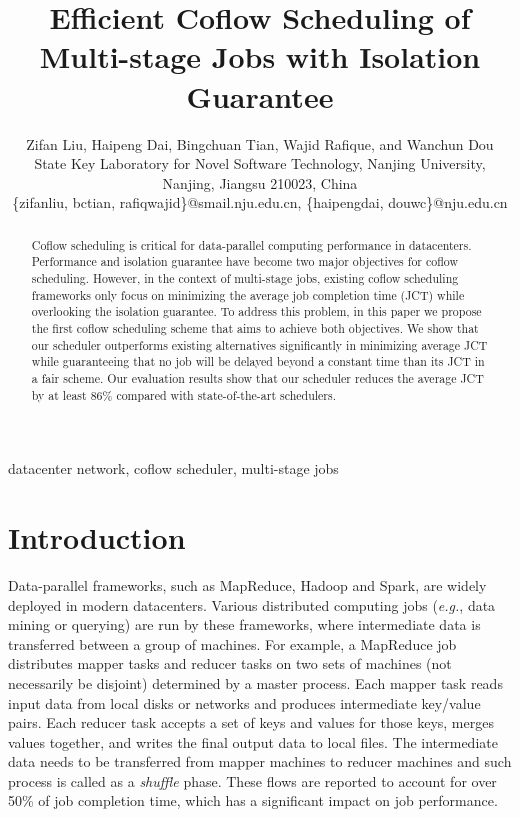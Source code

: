 \documentclass[10pt, conference, letterpaper]{IEEEtran}
\begin{document}
\title{Efficient Coflow Scheduling of Multi-stage Jobs with Isolation Guarantee}

\author{Zifan Liu, Haipeng Dai, Bingchuan Tian, Wajid Rafique, and Wanchun Dou\\
State Key Laboratory for Novel Software Technology, Nanjing University, Nanjing, Jiangsu 210023, China\\
\{zifanliu, bctian, rafiqwajid\}@smail.nju.edu.cn, \{haipengdai, douwc\}@nju.edu.cn}

\maketitle

\begin{abstract}
Coflow scheduling is critical for data-parallel computing performance in datacenters. Performance and isolation guarantee have become two major objectives for coflow scheduling. However, in the context of multi-stage jobs, existing coflow scheduling frameworks only focus on minimizing the average job completion time (JCT) while overlooking the isolation guarantee. To address this problem, in this paper we propose the first coflow scheduling scheme that %
aims to achieve both objectives.
%
We show that our scheduler outperforms existing alternatives significantly in minimizing average JCT while guaranteeing that no job will be delayed beyond a constant time than its JCT in a fair scheme. Our evaluation results show that our scheduler reduces the average JCT by at least 86\% compared with state-of-the-art schedulers.
\end{abstract}

\begin{IEEEkeywords}
datacenter network, coflow scheduler, multi-stage jobs
\end{IEEEkeywords}

\section{Introduction}
Data-parallel frameworks, such as MapReduce\cite{MapReduce}, Hadoop\cite{Hadoop} and Spark\cite{Spark}, are widely deployed in modern datacenters. Various distributed computing jobs (\emph{e.g.}, data mining or querying) are run by these frameworks, where intermediate data is transferred between a group of machines. For example, a MapReduce job distributes mapper tasks and reducer tasks on two sets of machines (not necessarily be disjoint) determined by a master process. Each mapper task reads input data from local disks or networks and produces intermediate key/value pairs. Each reducer task accepts a set of keys and values for those keys, merges values together, and writes the final output data to local files. The intermediate data needs to be transferred from mapper machines to reducer machines and such process is called as a \emph{shuffle} phase. These flows are reported to account for over 50\% of job completion time, which has a significant impact on job performance\cite{orchestra}.
\end{document}
